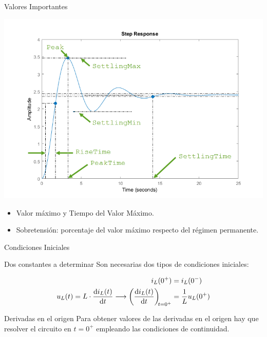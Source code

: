 \documentclass[aspectratio=169, usenames,svgnames,dvipsnames]{beamer}
\begin{document}
\begin{frame}[label={sec:org82c9ca3}]{Valores Importantes}
\begin{center}
\includegraphics[height=0.6\textheight]{figs/RespuestaEscalon_SegundoOrden.png}
\end{center}

\begin{itemize}
\item \alert{Valor máximo} y \alert{Tiempo del Valor Máximo}.

\item \alert{Sobretensión}: porcentaje del valor máximo respecto del régimen permanente.
\end{itemize}
\end{frame}


\begin{frame}[label={sec:orgc2b798b}]{Condiciones Iniciales}
\begin{block}{Dos constantes a determinar}
Son necesarias dos tipos de condiciones iniciales:

\begin{align*}
  i_L(0^+) &= i_L(0^-)\\
  u_L(t) = L \cdot \diff{i_L(t)}{t} \longrightarrow   \diff{i_L(t)}{t}[t = 0^+] &= \frac{1}{L} u_L(0^+)
\end{align*}
\end{block}

\begin{block}{Derivadas en el origen}
Para obtener valores de las derivadas en el origen hay que resolver el circuito en \(t = 0^+\) empleando las condiciones de continuidad.
\end{block}
\end{frame}
\end{document}
